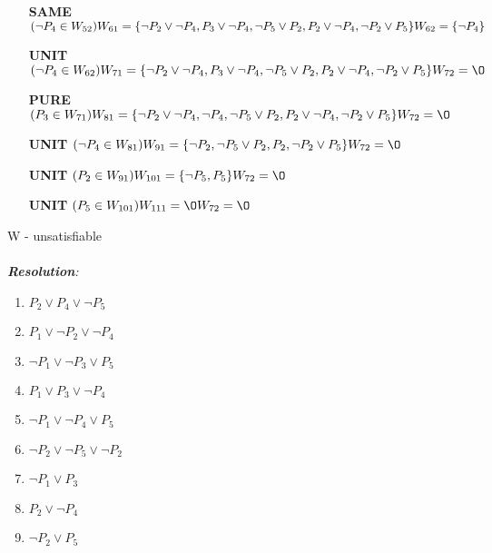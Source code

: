 \documentclass[a4paper,12pt, centered]{article}
\begin{document}
\begin{enumerate}
\begin{itemize}
		\item [\textbf{SAME}] $(\neg P_4\in W_{52})\\W_{61} = \{\neg P_2 \lor  \neg P_4, P_3 \lor  \neg P_4, \neg P_5\lor P_2, P_2 \lor  \neg P_4, \neg P_2 \lor P_5\}\\W_{62} = \{ \neg P_4\}$
		\item [\textbf{UNIT}] $(\neg P_4\in W_{62})\\W_{71} = \{\neg P_2 \lor  \neg P_4, P_3 \lor  \neg P_4, \neg P_5\lor P_2, P_2 \lor  \neg P_4, \neg P_2 \lor P_5\}\\W_{72} = \O $
		\item [\textbf{PURE}] $(P_3\in W_{71})\\W_{81} = \{\neg P_2 \lor  \neg P_4,\neg P_4, \neg P_5\lor P_2, P_2 \lor  \neg P_4, \neg P_2 \lor P_5\}\\W_{72} = \O $
		\item [\textbf{UNIT}] $(\neg P_4\in W_{81})\\W_{91} = \{\neg P_2 , \neg P_5\lor P_2, P_2,  \neg P_2 \lor P_5\}\\W_{72} = \O $
		\item [\textbf{UNIT}] $( P_2\in W_{91})\\W_{101} = \{\neg P_5,P_5\}\\W_{72} = \O $
		\item [\textbf{UNIT}] $( P_5\in W_{101})\\W_{111} = \O\\W_{72} = \O $
	\end{itemize}W - unsatisfiable
	\\\\\emph{\textbf{Resolution}:}\\
	\begin{multicols}{3}
		\begin{enumerate}[(1)] 
			\item $P_2 \lor P_4 \lor  \neg P_5$
			\item $P_1 \lor  \neg P_2 \lor  \neg P_4$
			\item $\neg P_1 \lor  \neg P_3 \lor P_5$
			\item $ P_1 \lor P_3 \lor  \neg P_4$
			\item $\neg P_1 \lor  \neg P_4 \lor P_5$
			\item $\neg P_2 \lor  \neg P_5 \lor  \neg P_2$
			\item $\neg P_1 \lor  P_3$
			\item $P_2 \lor  \neg P_4$
			\item $\neg P_2 \lor P_5$
		\end{enumerate}

\end{multicols}
\end{enumerate}
\end{document}
